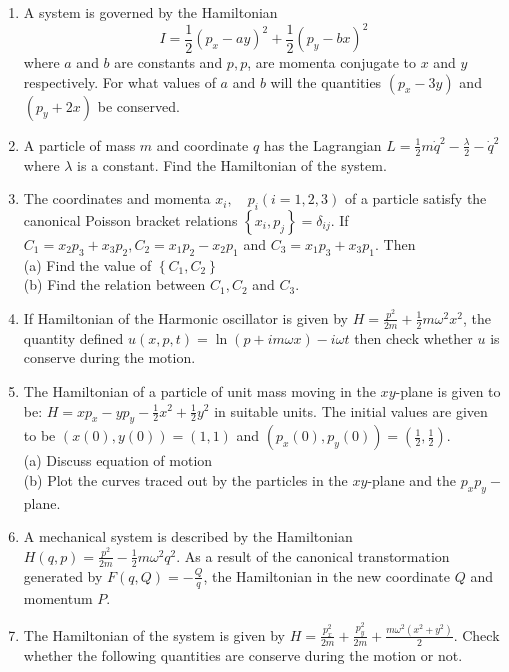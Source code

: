 \begin{enumerate}
	\item A system is governed by the Hamiltonian
	$$
	I=\frac{1}{2}\left(p_{x}-a y\right)^{2}+\frac{1}{2}\left(p_{y}-b x\right)^{2}
	$$
	where $a$ and $b$ are constants and $p, p$, are momenta conjugate to $x$ and $y$ respectively. For what values of $a$ and $b$ will the quantities $\left(p_{x}-3 y\right)$ and $\left(p_{y}+2 x\right)$ be conserved.
	\item A particle of mass $m$ and coordinate $q$ has the Lagrangian $L=\frac{1}{2} m \dot{q}^{2}-\frac{\lambda}{2}-\dot{q}^{2}$ where $\lambda$ is a constant. Find the Hamiltonian of the system.
	\item The coordinates and momenta $x_{i}, \quad p_{i}(i=1,2,3)$ of a particle satisfy the canonical Poisson bracket relations $\left\{x_{i}, p_{j}\right\}=\delta_{i j}$. If $C_{1}=x_{2} p_{3}+x_{3} p_{2}, C_{2}=x_{1} p_{2}-x_{2} p_{1}$ and $C_{3}=x_{1} p_{3}+x_{3} p_{1} .$ Then\\
	(a) Find the value of $\left\{C_{1}, C_{2}\right\}$\\
	(b) Find the relation between $C_{1}, C_{2}$ and $C_{3}$.
	\item If Hamiltonian of the Harmonic oscillator is given by $H=\frac{p^{2}}{2 m}+\frac{1}{2} m \omega^{2} x^{2}$, the quantity defined $u(x, p, t)=\ln (p+i m \omega x)-i \omega t$ then check whether $u$ is conserve during the motion.
	\item The Hamiltonian of a particle of unit mass moving in the $x y$-plane is given to be: $H=x p_{x}-y p_{y}-\frac{1}{2} x^{2}+\frac{1}{2} y^{2}$ in suitable units. The initial values are given to be $(x(0), y(0))=(1,1)$ and $\left(p_{x}(0), p_{y}(0)\right)=\left(\frac{1}{2}, \frac{1}{2}\right)$.\\
	(a) Discuss equation of motion\\
	(b) Plot the curves traced out by the particles in the $x y$-plane and the $p_{x} p_{y}-$ plane.
	\item A mechanical system is described by the Hamiltonian $H(q, p)=\frac{p^{2}}{2 m}-\frac{1}{2} m \omega^{2} q^{2} .$ As a result of the canonical transtormation generated by $F(q, Q)=-\frac{Q}{q}$, the Hamiltonian in the new coordinate $Q$ and momentum $P$.
	\item The Hamiltonian of the system is given by $H=\frac{p_{x}^{2}}{2 m}+\frac{p_{y}^{2}}{2 m}+\frac{m \omega^{2}\left(x^{2}+y^{2}\right)}{2}$. Check whether the following quantities are conserve during the motion or not.\\

\end{enumerate}
